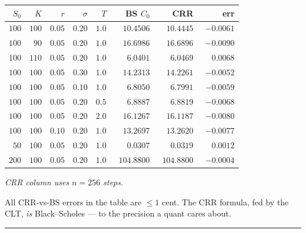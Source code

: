 \documentclass[
  10pt,
  twoside]{book}
\newcounter{none} %
\begin{document}
{\def\LTcaptype{none} %
\begin{table}[H]
\centering
\begin{tabular}{|r|r|r|r|r|r|r|r|}
\toprule
\(S_0\) & \(K\) & \(r\) & \(\sigma\) & \(T\) & BS \(C_0\) & CRR & err \\
\midrule



\(100\) & \(100\) & \(0.05\) & \(0.20\) & \(1.0\) &
\(\phantom{00}10.4506\) & \(\phantom{00}10.4445\) & \(-0.0061\) \\
\(100\) & \(\phantom{0}90\) & \(0.05\) & \(0.20\) & \(1.0\) &
\(\phantom{00}16.6986\) & \(\phantom{00}16.6896\) & \(-0.0090\) \\
\(100\) & \(110\) & \(0.05\) & \(0.20\) & \(1.0\) &
\(\phantom{000}6.0401\) & \(\phantom{000}6.0469\) &
\(\phantom{-}0.0068\) \\
\(100\) & \(100\) & \(0.05\) & \(0.30\) & \(1.0\) &
\(\phantom{00}14.2313\) & \(\phantom{00}14.2261\) & \(-0.0052\) \\
\(100\) & \(100\) & \(0.05\) & \(0.10\) & \(1.0\) &
\(\phantom{000}6.8050\) & \(\phantom{000}6.7991\) & \(-0.0059\) \\
\(100\) & \(100\) & \(0.05\) & \(0.20\) & \(0.5\) &
\(\phantom{000}6.8887\) & \(\phantom{000}6.8819\) & \(-0.0068\) \\
\(100\) & \(100\) & \(0.05\) & \(0.20\) & \(2.0\) &
\(\phantom{00}16.1267\) & \(\phantom{00}16.1187\) & \(-0.0080\) \\
\(100\) & \(100\) & \(0.10\) & \(0.20\) & \(1.0\) &
\(\phantom{00}13.2697\) & \(\phantom{00}13.2620\) & \(-0.0077\) \\
\(\phantom{0}50\) & \(100\) & \(0.05\) & \(0.20\) & \(1.0\) &
\(\phantom{000}0.0307\) & \(\phantom{000}0.0319\) &
\(\phantom{-}0.0012\) \\
\(200\) & \(100\) & \(0.05\) & \(0.20\) & \(1.0\) & \(104.8800\) &
\(104.8800\) & \(-0.0004\) \\
\bottomrule
\end{tabular}
\end{table}
}

\emph{CRR column uses \(n = 256\) steps.}

All CRR-vs-BS errors in the table are \(\le 1\) cent. The CRR formula,
fed by the CLT, \emph{is} Black--Scholes --- to the precision a quant
cares about.

\begin{center}\rule{0.5\linewidth}{0.5pt}\end{center}
\end{document}

